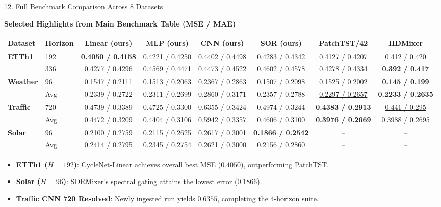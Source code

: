 \documentclass[aspectratio=169, 10pt]{beamer}
\begin{document}
\begin{frame}{12. Full Benchmark Comparison Across 8 Datasets}
\begin{center}
\textbf{Selected Highlights from Main Benchmark Table (MSE / MAE)}
\end{center}
\vspace{-0.2cm}
\begin{table}[htbp]
\centering
\scriptsize
\setlength{\tabcolsep}{3.5pt}
\begin{tabular}{llcccccc}
\toprule
\textbf{Dataset} & \textbf{Horizon} & \textbf{Linear (ours)} & \textbf{MLP (ours)} & \textbf{CNN (ours)} & \textbf{SOR (ours)} & \textbf{PatchTST/42} & \textbf{HDMixer} \\
\midrule
\textbf{ETTh1} & 192 & \textbf{0.4050 / 0.4158} & 0.4221 / 0.4250 & 0.4402 / 0.4498 & 0.4283 / 0.4342 & 0.4127 / 0.4207 & 0.412 / 0.420 \\
              & 336 & \underline{0.4277 / 0.4296} & 0.4569 / 0.4471 & 0.4473 / 0.4522 & 0.4602 / 0.4578 & 0.4278 / 0.4334 & \textbf{0.392 / 0.417} \\
\midrule
\textbf{Weather}& 96  & 0.1547 / 0.2111 & 0.1513 / 0.2063 & 0.2367 / 0.2863 & \underline{0.1507 / 0.2098} & 0.1525 / \underline{0.2002} & \textbf{0.145 / 0.199} \\
              & Avg & 0.2339 / 0.2722 & 0.2311 / 0.2699 & 0.2860 / 0.3171 & 0.2357 / 0.2788 & \underline{0.2297 / 0.2657} & \textbf{0.2233 / 0.2635} \\
\midrule
\textbf{Traffic}& 720 & 0.4739 / 0.3389 & 0.4725 / 0.3300 & 0.6355 / 0.3424 & 0.4974 / 0.3244 & \textbf{0.4383 / 0.2913} & \underline{0.441 / 0.295} \\
              & Avg & 0.4472 / 0.3209 & 0.4404 / 0.3106 & 0.5942 / 0.3357 & 0.4606 / 0.3100 & \textbf{0.3976 / 0.2669} & \underline{0.3988 / 0.2695} \\
\midrule
\textbf{Solar}  & 96  & 0.2100 / 0.2759 & 0.2115 / 0.2625 & 0.2617 / 0.3001 & \textbf{0.1866 / 0.2542} & -- & -- \\
              & Avg & 0.2414 / 0.2795 & 0.2345 / 0.2754 & 0.2621 / 0.3000 & 0.2156 / 0.2860 & -- & -- \\
\bottomrule
\end{tabular}
\end{table}
\vspace{-0.1cm}
\begin{itemize}
    \item \textbf{ETTh1 ($H=192$)}: CycleNet-Linear achieves overall best MSE ($0.4050$), outperforming PatchTST.
    \item \textbf{Solar ($H=96$)}: SORMixer's spectral gating attains the lowest error ($0.1866$).
    \item \textbf{Traffic CNN 720 Resolved}: Newly ingested run yields $0.6355$, completing the 4-horizon suite.
\end{itemize}
\end{frame}
\end{document}
